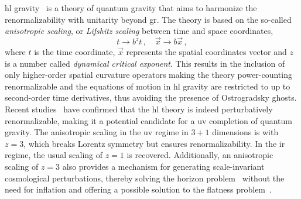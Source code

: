 \documentclass[superscriptaddress,aps,preprintnumbers,nofootinbib]{revtex4-2}
\begin{document}
\ac{hl} gravity~\cite{Horava:2009uw} is a theory of quantum gravity that aims to harmonize the renormalizability with unitarity beyond \ac{gr}. The theory is based on the so-called \textit{anisotropic scaling}, or \textit{Lifshitz scaling} between time and space coordinates,
\begin{equation}
 t \to b^z t\,, \quad \vec{x} \to b \vec{x}\,, 
\end{equation}
where $t$ is the time coordinate, $\vec{x}$ represents the spatial coordinates vector and $z$ is a number called \textit{dynamical critical exponent}. This results in the inclusion of only higher-order spatial curvature operators making the theory power-counting renormalizable and the equations of motion in \ac{hl} gravity are restricted to up to second-order time derivatives, thus avoiding the presence of Ostrogradsky ghosts. Recent studies~\cite{Barvinsky:2015kil,Barvinsky:2017zlx} have confirmed that the \ac{hl} theory is indeed perturbatively renormalizable, making it a potential candidate for a \ac{uv} completion of quantum gravity. The anisotropic scaling in the \ac{uv} regime in $3+1$ dimensions is with $z=3$, which breaks Lorentz symmetry but ensures renormalizability. In the \ac{ir} regime, the usual scaling of $z=1$ is recovered. Additionally, an anisotropic scaling of $z=3$ also provides a mechanism for generating scale-invariant cosmological perturbations, thereby solving the horizon problem~\cite{Mukohyama:2009gg} without the need for inflation and offering a possible solution to the flatness problem~\cite{Bramberger:2017tid}. 
\end{document}
